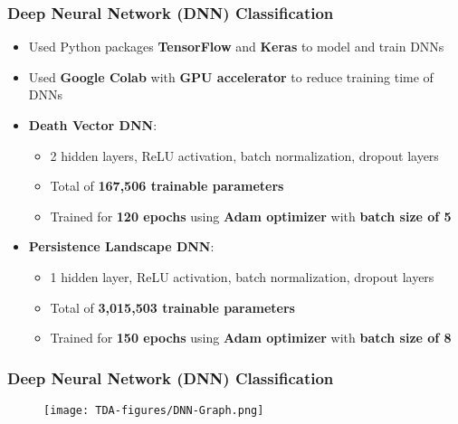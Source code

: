 \documentclass[aspectratio=169]{beamer}
\begin{document}
\begin{frame}
\frametitle{Deep Neural Network (DNN) Classification} %

\begin{itemize}\justifying
\item Used Python packages {\bfseries \textcolor{UF_dark_blue}{TensorFlow}} and {\bfseries \textcolor{UF_dark_blue}{Keras}} to model and train DNNs

\item Used {\bfseries \textcolor{UF_dark_blue}{Google Colab}} with {\bfseries \textcolor{UF_dark_blue}{GPU accelerator}} to reduce training time of DNNs

\item {\bfseries \textcolor{UF_dark_blue}{Death Vector DNN}}: 
	\begin{itemize}\justifying
	\item 2 hidden layers, ReLU activation, batch normalization, dropout layers
	\item Total of {\bfseries \textcolor{UF_dark_blue}{167,506 trainable parameters}}
	\item Trained for {\bfseries \textcolor{UF_dark_blue}{120 epochs}} using {\bfseries \textcolor{UF_dark_blue}{Adam optimizer}} with {\bfseries \textcolor{UF_dark_blue}{batch size of 5}}
	\end{itemize}

\item {\bfseries \textcolor{UF_dark_blue}{Persistence Landscape DNN}}: 	
	\begin{itemize}\justifying
	\item 1 hidden layer, ReLU activation, batch normalization, dropout layers
	\item Total of {\bfseries \textcolor{UF_dark_blue}{3,015,503 trainable parameters}}
	\item Trained for {\bfseries \textcolor{UF_dark_blue}{150 epochs}} using {\bfseries \textcolor{UF_dark_blue}{Adam optimizer}} with {\bfseries \textcolor{UF_dark_blue}{batch size of 8}}
	\end{itemize}	

\end{itemize}

\end{frame}

\begin{frame}
\frametitle{Deep Neural Network (DNN) Classification} %

\vspace*{-6mm}
\begin{figure}[H]
\centering
  \texttt{[image: TDA-figures/DNN-Graph.png]}
\end{figure}

\end{frame}
\end{document}
